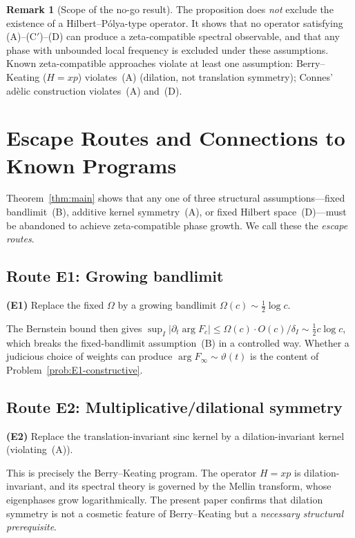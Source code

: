 \documentclass[12pt,a4paper]{amsart}
\theoremstyle{definition}
\newtheorem{remark}[theorem]{Remark}
\begin{document}
\begin{remark}[Scope of the no-go result]
\label{rem:no-go-scope}
The proposition does \emph{not} exclude the existence
of a Hilbert--P\'{o}lya-type operator. It shows that
no operator satisfying (A)--(C$'$)--(D) can produce
a zeta-compatible spectral observable, and that any
phase with unbounded local frequency is excluded under
these assumptions. Known zeta-compatible approaches
violate at least one assumption:
Berry--Keating ($H = xp$) violates~(A) (dilation,
not translation symmetry); Connes' ad\`{e}lic
construction violates~(A) and~(D).
\end{remark}

\section{Escape Routes and Connections to Known
Programs}
\label{sec:escape}

Theorem~\ref{thm:main} shows that any one of three
structural assumptions---fixed bandlimit~(B), additive
kernel symmetry~(A), or fixed Hilbert space~(D)---must
be abandoned to achieve zeta-compatible phase growth.
We call these the \emph{escape routes}.

\subsection{Route E1: Growing bandlimit}
\label{ssec:escape-band}

\textbf{(E1)} Replace the fixed $\Omega$ by a growing
bandlimit $\Omega(c) \sim \tfrac{1}{2}\log c$.

The Bernstein bound then gives
$\sup_I |\partial_t \arg F_c|
\le \Omega(c) \cdot O(c) / \delta_I
\sim \tfrac{1}{2}c \log c$,
which breaks the fixed-bandlimit assumption~(B) in
a controlled way. Whether a judicious choice of
weights can produce
$\arg F_\infty \sim \vartheta(t)$ is the content
of Problem~\ref{prob:E1-constructive}.

\subsection{Route E2: Multiplicative/dilational
symmetry}
\label{ssec:escape-mult}

\textbf{(E2)} Replace the translation-invariant sinc
kernel by a dilation-invariant kernel
(violating~(A)).

This is precisely the Berry--Keating program.
The operator $H = xp$ is dilation-invariant, and its
spectral theory is governed by the Mellin transform,
whose eigenphases grow logarithmically. The present
paper confirms that dilation symmetry is not a
cosmetic feature of Berry--Keating but a
\emph{necessary structural prerequisite}.
\end{document}
